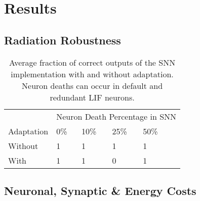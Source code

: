 \section{Results}\label{sec:results}

\subsection{Radiation Robustness}\label{subsec:algorithm_performance}

\begin{table}[H]
\caption{Average fraction of correct outputs of the SNN implementation with and without adaptation. Neuron deaths can occur in default and redundant LIF neurons.}
\begin{tabular}{llllll}
        & \multicolumn{5}{l}{Neuron Death Percentage in SNN} \\ \cmidrule{2-6}
        Adaptation & 0\%    & 10\%    & 25\%    & 50\%     \\ \hline
        Without      & 1      & 1       & 1       & 1            \\
        With      & 1      & 1       & 0       & 1            \\
        
\end{tabular}
\end{table}


\subsection{Neuronal, Synaptic \& Energy Costs}\label{subsec:results_neuronal_synaptic_overcapacity}


